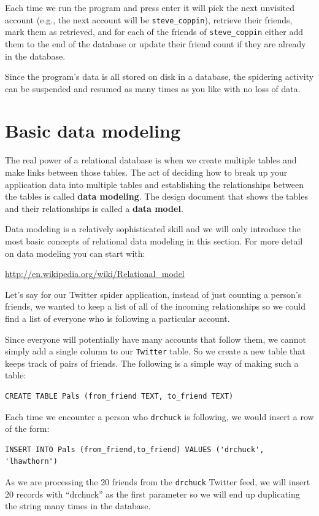 Each time we run the program and press enter it will pick the next 
unvisited account (e.g., the next account will be \verb"steve_coppin"),
retrieve their friends, mark them as retrieved, and for each of the 
friends of \verb"steve_coppin" either add them to the end of the 
database or update their friend count if they are already in the
database.

Since the program's data is all stored on disk in a database, 
the spidering activity can be suspended and resumed as many times as you 
like with no loss of data.

\section{Basic data modeling}

The real power of a relational database is when we create multiple tables
and make links between those tables.   The act of deciding how to break
up your application data into multiple tables and establishing the
relationships between the tables is called {\bf data modeling}.  The
design document that shows the tables and their relationships 
is called a {\bf data model}.

Data modeling is a relatively sophisticated skill and we will only introduce
the most basic concepts of relational data modeling in this section.  For more
detail on data modeling you can start with:

\url{http://en.wikipedia.org/wiki/Relational_model}

Let's say for our Twitter spider application, instead of just 
counting a person's friends, we wanted to keep a list of 
all of the incoming relationships so we could find a list of 
everyone who is following a particular account.

Since everyone will potentially have many accounts that follow
them, we cannot simply add a single column to our {\tt Twitter} table. 
So we create a new table that keeps track of pairs of friends.
The following is a simple way of making such a table:

\beforeverb
\begin{verbatim}
CREATE TABLE Pals (from_friend TEXT, to_friend TEXT)
\end{verbatim}
\afterverb
%
Each time we encounter a person who {\tt drchuck} is following, we
would insert a row of the form:

\beforeverb
\begin{verbatim}
INSERT INTO Pals (from_friend,to_friend) VALUES ('drchuck', 'lhawthorn')
\end{verbatim}
\afterverb
%
As we are processing the 20 friends from the {\tt drchuck}
Twitter feed, we will insert 20 records with ``drchuck''
as the first parameter so we will end up duplicating the 
string many times in the database.

